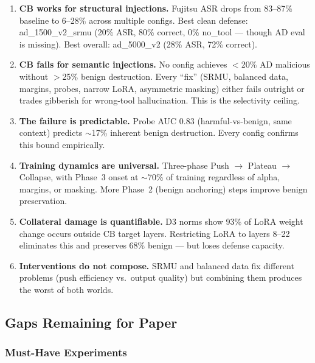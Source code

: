 \documentclass[11pt]{article}
\begin{document}
\begin{enumerate}
  \item \textbf{CB works for structural injections.} Fujitsu ASR drops
        from 83--87\% baseline to 6--28\% across multiple configs.  Best
        clean defense: ad\_1500\_v2\_srmu (20\% ASR, 80\% correct, 0\%
        no\_tool --- though AD eval is missing).  Best overall:
        ad\_5000\_v2 (28\% ASR, 72\% correct).

  \item \textbf{CB fails for semantic injections.} No config achieves
        $<$20\% AD malicious without $>$25\% benign destruction.
        Every ``fix'' (SRMU, balanced data, margins, probes, narrow LoRA,
        asymmetric masking) either fails outright or trades gibberish for
        wrong-tool hallucination.  This is the selectivity ceiling.

  \item \textbf{The failure is predictable.} Probe AUC 0.83
        (harmful-vs-benign, same context) predicts $\sim$17\% inherent
        benign destruction.  Every config confirms this bound empirically.

  \item \textbf{Training dynamics are universal.} Three-phase
        Push $\to$ Plateau $\to$ Collapse, with Phase~3 onset at
        $\sim$70\% of training regardless of alpha, margins, or masking.
        More Phase~2 (benign anchoring) steps improve benign preservation.

  \item \textbf{Collateral damage is quantifiable.} D3 norms show
        93\% of LoRA weight change occurs outside CB target layers.
        Restricting LoRA to layers 8--22 eliminates this and preserves
        68\% benign --- but loses defense capacity.

  \item \textbf{Interventions do not compose.} SRMU and balanced data
        fix different problems (push efficiency vs.\ output quality) but
        combining them produces the worst of both worlds.
\end{enumerate}

\subsection{Gaps Remaining for Paper}

\subsubsection{Must-Have Experiments}
\end{document}
